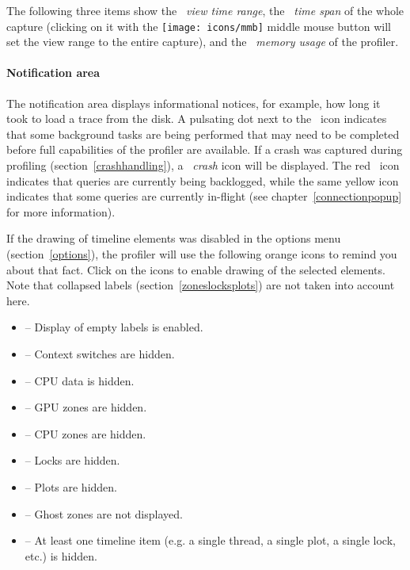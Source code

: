 \documentclass[hidelinks,titlepage,a4paper,twoside]{article}
\newcommand{\MMB}{\texttt{[image: icons/mmb]}}
\begin{document}
The following three items show the \emph{\faEye{}~view time range}, the \emph{\faDatabase{}~time span} of the whole capture (clicking on it with the \MMB{} middle mouse button will set the view range to the entire capture), and the \emph{\faMemory{}~memory usage} of the profiler.

\paragraph{Notification area}

The notification area displays informational notices, for example, how long it took to load a trace from the disk. A pulsating dot next to the \faTasks~icon indicates that some background tasks are being performed that may need to be completed before full capabilities of the profiler are available. If a crash was captured during profiling (section~\ref{crashhandling}), a \emph{\faSkull{}~crash} icon will be displayed. The red \faSatelliteDish{}~icon indicates that queries are currently being backlogged, while the same yellow icon indicates that some queries are currently in-flight (see chapter~\ref{connectionpopup} for more information).

If the drawing of timeline elements was disabled in the options menu (section~\ref{options}), the profiler will use the following orange icons to remind you about that fact. Click on the icons to enable drawing of the selected elements. Note that collapsed labels (section~\ref{zoneslocksplots}) are not taken into account here.

\begin{itemize}
\item \faExpand{} -- Display of empty labels is enabled.
\item \faHiking{} -- Context switches are hidden.
\item \faSlidersH{} -- CPU data is hidden.
\item \faEye{} -- GPU zones are hidden.
\item \faMicrochip{} -- CPU zones are hidden.
\item \faLock{} -- Locks are hidden.
\item \faSignature{} -- Plots are hidden.
\item \faGhost{} -- Ghost zones are not displayed.
\item \faLowVision{} -- At least one timeline item (e.g. a single thread, a single plot, a single lock, etc.) is hidden.
\end{itemize}
\end{document}
